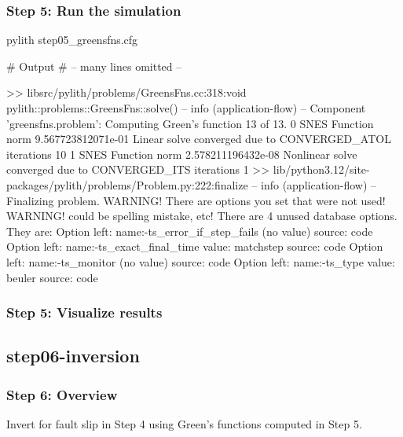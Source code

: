 \documentclass[aspectratio=169]{beamer}
\begin{document}
\begin{frame}[fragile]
  \frametitle{Step 5: Run the simulation}
  \summary{}

\begin{pyrejournal}
pylith step05_greensfns.cfg

# Output
# -- many lines omitted --

 >> libsrc/pylith/problems/GreensFns.cc:318:void pylith::problems::GreensFns::solve()
 -- info (application-flow)
 -- Component 'greensfns.problem': Computing Green's function 13 of 13.
  0 SNES Function norm 9.567723812071e-01
    Linear solve converged due to CONVERGED_ATOL iterations 10
  1 SNES Function norm 2.578211196432e-08
  Nonlinear solve converged due to CONVERGED_ITS iterations 1
 >> lib/python3.12/site-packages/pylith/problems/Problem.py:222:finalize
 -- info (application-flow)
 -- Finalizing problem.
WARNING! There are options you set that were not used!
WARNING! could be spelling mistake, etc!
There are 4 unused database options. They are:
Option left: name:-ts_error_if_step_fails (no value) source: code
Option left: name:-ts_exact_final_time value: matchstep source: code
Option left: name:-ts_monitor (no value) source: code
Option left: name:-ts_type value: beuler source: code
\end{pyrejournal}
  
\end{frame}


\begin{frame}
  \frametitle{Step 5: Visualize results}

    
\end{frame}


\subsection{step06-inversion}

\begin{frame}
  \frametitle{Step 6: Overview}
  \summary{}

  Invert for fault slip in Step 4 using Green's functions computed in Step 5.
      
\end{frame}
\end{document}
